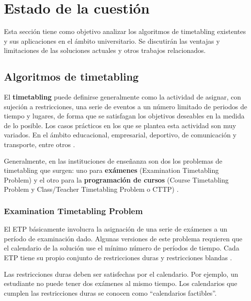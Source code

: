 \chapter{Estado de la cuestión}

Esta sección tiene como objetivo analizar los algoritmos de timetabling existentes y sus aplicaciones en el ámbito universitario. Se discutirán las ventajas y limitaciones de las soluciones actuales y otros trabajos relacionados.\newpage

\section{Algoritmos de timetabling}

El \textbf{timetabling} puede definirse generalmente como la actividad de asignar, con sujeción a restricciones, una serie de eventos a un número limitado de periodos de tiempo y lugares, de forma que se satisfagan los objetivos deseables en la medida de lo posible. Los casos prácticos en los que se plantea esta actividad son muy variados. En el ámbito educacional, empresarial, deportivo, de comunicación y transporte, entre otros \cite{hybrid-timetabling}.\newline

Generalmente, en las instituciones de enseñanza son dos los problemas de timetabling que surgen: uno para \textbf{exámenes} (Examination Timetabling Problem) y el otro para la \textbf{programación de cursos} (Course Timetabling Problem y Class/Teacher Timetabling Problem o CTTP) \cite{carter}.\newline

\subsection{Examination Timetabling Problem}
El ETP básicamente involucra la asignación de una serie de exámenes a un período de examinación dado. Algunas versiones de este problema requieren que el calendario de la solución use el mínimo número de períodos de tiempo. Cada ETP tiene su propio conjunto de restricciones duras y restricciones blandas \cite{AutomatedTimetabling} \cite{NAJIAZIMI2005705}.\newline

Las restricciones duras deben ser satisfechas por el calendario. Por ejemplo, un estudiante no puede tener dos exámenes al mismo tiempo. Los calendarios que cumplen las restricciones duras se conocen como ``calendarios factibles''.\newline

